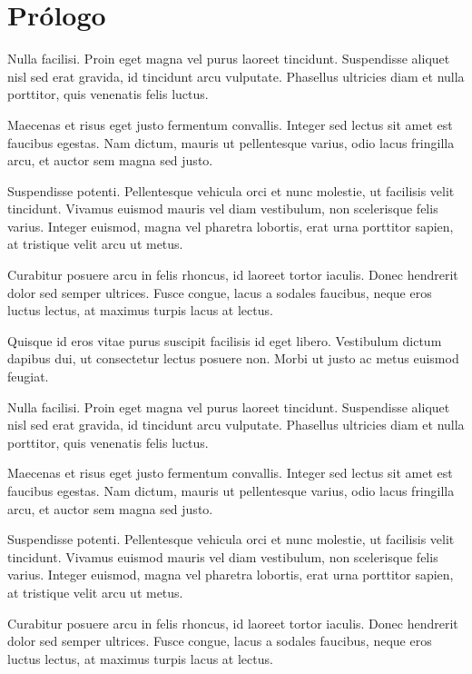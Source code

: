 \chapter[\hspace{1.5pc}Prólogo]{Prólogo}
\setcounter{PrimPag}{\theCurrentPage}

Nulla facilisi. Proin eget magna vel purus laoreet tincidunt. Suspendisse aliquet nisl sed erat gravida, id tincidunt arcu vulputate. Phasellus ultricies diam et nulla porttitor, quis venenatis felis luctus.

Maecenas et risus eget justo fermentum convallis. Integer sed lectus sit amet est faucibus egestas. Nam dictum, mauris ut pellentesque varius, odio lacus fringilla arcu, et auctor sem magna sed justo.

Suspendisse potenti. Pellentesque vehicula orci et nunc molestie, ut facilisis velit tincidunt. Vivamus euismod mauris vel diam vestibulum, non scelerisque felis varius. Integer euismod, magna vel pharetra lobortis, erat urna porttitor sapien, at tristique velit arcu ut metus.

Curabitur posuere arcu in felis rhoncus, id laoreet tortor iaculis. Donec hendrerit dolor sed semper ultrices. Fusce congue, lacus a sodales faucibus, neque eros luctus lectus, at maximus turpis lacus at lectus.

Quisque id eros vitae purus suscipit facilisis id eget libero. Vestibulum dictum dapibus dui, ut consectetur lectus posuere non. Morbi ut justo ac metus euismod feugiat.

Nulla facilisi. Proin eget magna vel purus laoreet tincidunt. Suspendisse aliquet nisl sed erat gravida, id tincidunt arcu vulputate. Phasellus ultricies diam et nulla porttitor, quis venenatis felis luctus.

Maecenas et risus eget justo fermentum convallis. Integer sed lectus sit amet est faucibus egestas. Nam dictum, mauris ut pellentesque varius, odio lacus fringilla arcu, et auctor sem magna sed justo.

Suspendisse potenti. Pellentesque vehicula orci et nunc molestie, ut facilisis velit tincidunt. Vivamus euismod mauris vel diam vestibulum, non scelerisque felis varius. Integer euismod, magna vel pharetra lobortis, erat urna porttitor sapien, at tristique velit arcu ut metus.

Curabitur posuere arcu in felis rhoncus, id laoreet tortor iaculis. Donec hendrerit dolor sed semper ultrices. Fusce congue, lacus a sodales faucibus, neque eros luctus lectus, at maximus turpis lacus at lectus.

